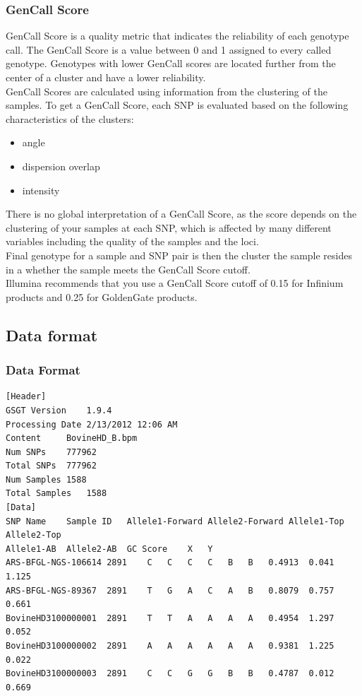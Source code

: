 \documentclass[pdf]{beamer}
\begin{document}
\begin{frame}[allowframebreaks]
\frametitle{GenCall Score}
GenCall Score is a quality metric that indicates the reliability of each genotype call. The GenCall Score is a value between 0 and 1 assigned to every called genotype. Genotypes with lower GenCall scores are located further from the center of a cluster and have a lower reliability.\\
GenCall Scores are calculated using information from the clustering of the samples. To get a GenCall Score, each SNP is evaluated based on the following characteristics of the clusters:
\begin{itemize}
  \item angle
  \item dispersion overlap
  \item intensity
\end{itemize}
There is no global interpretation of a GenCall Score, as the score depends on the clustering of your samples at each SNP, which is affected by many different variables including the quality of the samples and the loci.\\
\vspace{0.2in}
Final genotype for a sample and SNP pair is then the cluster the sample resides in a whether the sample meets the GenCall Score cutoff.\\
Illumina recommends that you use a GenCall Score cutoff of 0.15 for Infinium products and 0.25 for GoldenGate products.\\
\end{frame}

\subsection{Data format}
\begin{frame}[fragile]
  \frametitle{Data Format}
\begin{tiny}
\begin{verbatim}
[Header]
GSGT Version	1.9.4
Processing Date	2/13/2012 12:06 AM
Content		BovineHD_B.bpm
Num SNPs	777962
Total SNPs	777962
Num Samples	1588
Total Samples	1588
[Data]
SNP Name	Sample ID	Allele1-Forward	Allele2-Forward	Allele1-Top	Allele2-Top	
Allele1-AB	Allele2-AB	GC Score	X	Y
ARS-BFGL-NGS-106614	2891	C	C	C	C	B	B	0.4913	0.041	1.125
ARS-BFGL-NGS-89367	2891	T	G	A	C	A	B	0.8079	0.757	0.661
BovineHD3100000001	2891	T	T	A	A	A	A	0.4954	1.297	0.052
BovineHD3100000002	2891	A	A	A	A	A	A	0.9381	1.225	0.022
BovineHD3100000003	2891	C	C	G	G	B	B	0.4787	0.012	0.669
\end{verbatim}
\end{tiny}
\end{frame}
\end{document}
